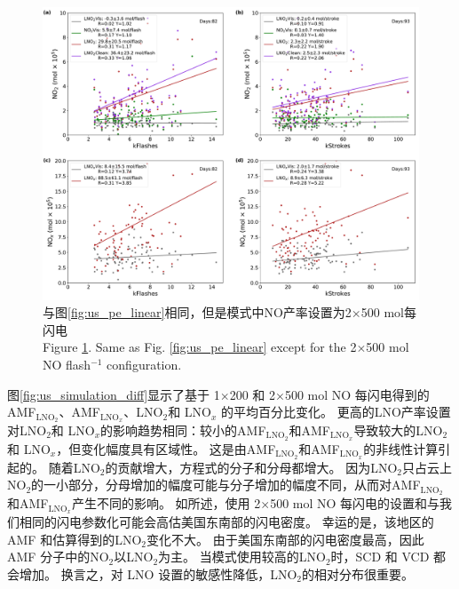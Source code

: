 \begin{figure}[!htbp]
\centering
\includegraphics[width=15cm]{./figures/us_pe_linear_2x500.pdf}
\caption{与图\ref{fig:us_pe_linear}相同，但是模式中NO产率设置为2$\times$500 mol每闪电 \\Figure \ref{fig:us_pe_linear_2x500}. Same as Fig. \ref{fig:us_pe_linear} except for the 2$\times$500 mol NO flash$^{-1}$ configuration.}
\label{fig:us_pe_linear_2x500}
\end{figure}

图\ref{fig:us_simulation_diff}显示了基于 1$\times$200 和 2$\times$500 mol NO 每闪电得到的AMF$_\textrm{LNO$_2$}$、AMF$_\textrm{LNO$_x$}$、LNO$_2$和 LNO$_x$ 的平均百分比变化。
更高的LNO产率设置对LNO$_2$和 LNO$_x$的影响趋势相同：较小的AMF$_\textrm{LNO$_2$}$和AMF$_\textrm{LNO$_x$}$导致较大的LNO$_2$和 LNO$_x$，但变化幅度具有区域性。
这是由AMF$_\textrm{LNO$_2$}$和AMF$_\textrm{LNO$_x$}$的非线性计算引起的。
随着LNO$_2$的贡献增大，方程式的分子和分母都增大。
因为LNO$_2$只占云上NO$_2$的一小部分，分母增加的幅度可能与分子增加的幅度不同，从而对AMF$_\textrm{LNO$_2$}$和AMF$_\textrm{LNO$_x$}$产生不同的影响。
如\citet{Zhu.2019}所述，使用 2$\times$500 mol NO 每闪电的设置和与我们相同的闪电参数化可能会高估美国东南部的闪电密度。
幸运的是，该地区的 AMF 和估算得到的LNO$_2$变化不大。
由于美国东南部的闪电密度最高，因此 AMF 分子中的NO$_2$以LNO$_2$为主。
当模式使用较高的LNO$_2$时，SCD 和 VCD 都会增加。
换言之，对 LNO 设置的敏感性降低，LNO$_2$的相对分布很重要。

